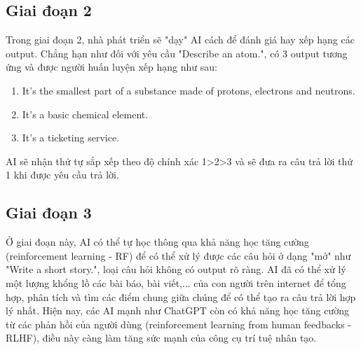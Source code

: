 \subsection{Giai đoạn 2}
Trong giai đoạn 2, nhà phát triển sẽ "dạy" AI cách để đánh giá hay xếp hạng các output. Chẳng hạn như đối với yêu cầu "Describe an atom.", có 3 output tương ứng và được người huấn luyện xếp hạng như sau:\cite{link_8}
\begin{enumerate}
    \item It's the smallest part of a substance made of protons, electrons and neutrons.
    \item It's a basic chemical element.
    \item It's a ticketing service.
\end{enumerate}
AI sẽ nhận thứ tự sắp xếp theo độ chính xác 1>2>3 và sẽ đưa ra câu trả lời thứ 1 khi được yêu cầu trả lời.
\subsection{Giai đoạn 3}
Ở giai đoạn này, AI có thể tự học thông qua khả năng học tăng cường (reinforcement learning - RF) để có thể xử lý được các câu hỏi ở dạng "mở" như "Write a short story.", loại câu hỏi không có output rõ ràng.
AI đã có thể xử lý một lượng khổng lồ các bài báo, bài viết,... của con người trên internet để tổng hợp, phân tích và tìm các điểm chung giữa chúng để có thể tạo ra câu trả lời hợp lý nhất. Hiện nay, các AI mạnh như ChatGPT còn có khả năng học tăng cường từ các phản hồi của người dùng (reinforcement learning from human feedbacks - RLHF),
điều này càng làm tăng sức mạnh của công cụ trí tuệ nhân tạo.
